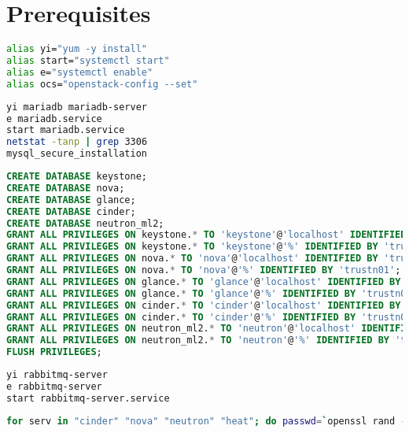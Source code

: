 \documentclass[11pt,letterpaper,oneside]{book}
\begin{document}
\chapter{Prerequisites}

\begin{lstlisting}[caption={Bash Aliases},language=bash]
alias yi="yum -y install"
alias start="systemctl start"
alias e="systemctl enable"
alias ocs="openstack-config --set"
\end{lstlisting}

\begin{lstlisting}[caption={Database Install},language=bash]
yi mariadb mariadb-server
e mariadb.service 
start mariadb.service 
netstat -tanp | grep 3306
mysql_secure_installation 
\end{lstlisting}

\begin{lstlisting}[caption={},language=sql]
CREATE DATABASE keystone;
CREATE DATABASE nova;
CREATE DATABASE glance;
CREATE DATABASE cinder;
CREATE DATABASE neutron_ml2;
GRANT ALL PRIVILEGES ON keystone.* TO 'keystone'@'localhost' IDENTIFIED BY 'trustn01';
GRANT ALL PRIVILEGES ON keystone.* TO 'keystone'@'%' IDENTIFIED BY 'trustn01';
GRANT ALL PRIVILEGES ON nova.* TO 'nova'@'localhost' IDENTIFIED BY 'trustn01';
GRANT ALL PRIVILEGES ON nova.* TO 'nova'@'%' IDENTIFIED BY 'trustn01';
GRANT ALL PRIVILEGES ON glance.* TO 'glance'@'localhost' IDENTIFIED BY 'trustn01';
GRANT ALL PRIVILEGES ON glance.* TO 'glance'@'%' IDENTIFIED BY 'trustn01';
GRANT ALL PRIVILEGES ON cinder.* TO 'cinder'@'localhost' IDENTIFIED BY 'trustn01';
GRANT ALL PRIVILEGES ON cinder.* TO 'cinder'@'%' IDENTIFIED BY 'trustn01';
GRANT ALL PRIVILEGES ON neutron_ml2.* TO 'neutron'@'localhost' IDENTIFIED BY 'trustn01';
GRANT ALL PRIVILEGES ON neutron_ml2.* TO 'neutron'@'%' IDENTIFIED BY 'trustn01';
FLUSH PRIVILEGES;
\end{lstlisting}


\begin{lstlisting}[caption={RabbitMQ Install},language=bash]
yi rabbitmq-server
e rabbitmq-server
start rabbitmq-server.service
\end{lstlisting}

\begin{lstlisting}[caption={Create RabbitMQ User Accounts},language=bash]
for serv in "cinder" "nova" "neutron" "heat"; do passwd=`openssl rand -base64 8`; echo "$serv - $passwd"; rabbitmqctl add_user $serv $passwd; rabbitmqctl set_permissions -p / $serv ".*" ".*" ".*"; done
\end{lstlisting}
\end{document}
